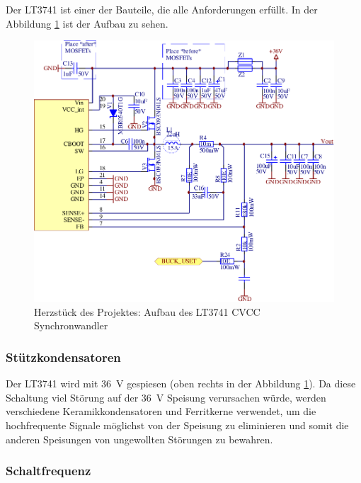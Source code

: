 Der LT3741 ist einer der Bauteile,  die  alle  Anforderungen  erf\"ullt.  In der
Abbildung \ref{fig:circuit:buck} ist der Aufbau zu sehen.

\begin{figure}[th!]
    \center
    \includegraphics[width=.75\textwidth]{images/circuit/buck.pdf}
    \caption{Herzst\"uck des Projektes: Aufbau des LT3741 CVCC Synchronwandler}
    \label{fig:circuit:buck}
\end{figure}

\subsubsection*{St\"utzkondensatoren}

Der  LT3741  wird mit \SI{36}{\volt} gespiesen (oben  rechts  in  der  Abbildung
\ref{fig:circuit:buck}).   Da   diese   Schaltung   viel   St\"orung   auf   der
\SI{36}{\volt}    Speisung     verursachen    w\"urde,    werden    verschiedene
Keramikkondensatoren  und  Ferritkerne  verwendet,  um die hochfrequente Signale
m\"oglichst von der Speisung zu eliminieren und somit die anderen Speisungen von
ungewollten St\"orungen zu bewahren.

\subsubsection*{Schaltfrequenz}

